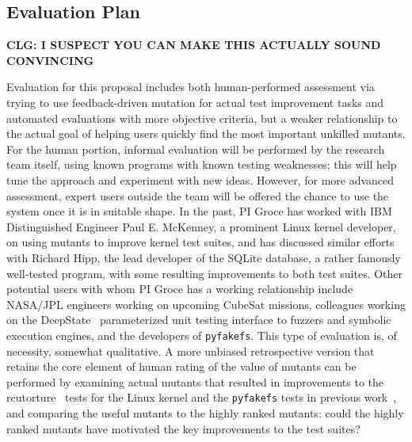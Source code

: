 
\subsection{Evaluation Plan}
\label{sec:evalplan}

{\bf CLG: I SUSPECT YOU CAN MAKE THIS ACTUALLY SOUND CONVINCING}

Evaluation for this proposal includes both human-performed assessment
via trying to use feedback-driven mutation for actual test improvement
tasks and automated evaluations with more objective criteria, but a
weaker relationship to the actual goal of helping users quickly find
the most important unkilled mutants.  For the human portion, informal
evaluation will be performed by the research team itself, using known
programs with known testing weaknesses; this will help tune the
approach and experiment with new ideas.  However, for more advanced
assessment, expert users outside the team will be offered the chance
to use the system once it is in suitable shape.  In the past, PI Groce
has worked with IBM Distinguished Engineer Paul E. McKenney, a
prominent Linux kernel developer, on using mutants to improve kernel
test suites, and has discussed similar efforts with Richard Hipp, the
lead developer of the SQLite database, a rather famously well-tested
program, with some resulting improvements to both test suites.  Other
potential users with whom PI Groce has a working relationship include  NASA/JPL engineers working on upcoming CubeSat
missions, colleagues working on the DeepState~\cite{DeepState}
parameterized unit testing interface to fuzzers and symbolic execution
engines, and the developers of {\tt pyfakefs}.  This type of
evaluation is, of necessity, somewhat qualitative.  A more unbiased retrospective
version that retains the core element of human rating of the value of mutants can be performed by examining actual mutants that resulted in
improvements to the rcutorture~\cite{rcutorture} tests for the Linux
kernel and the {\tt pyfakefs} tests in previous
work~\cite{groce2018verified}, and comparing the useful mutants to the
highly ranked mutants:  could the highly ranked mutants have motivated
the key improvements to the test suites?

